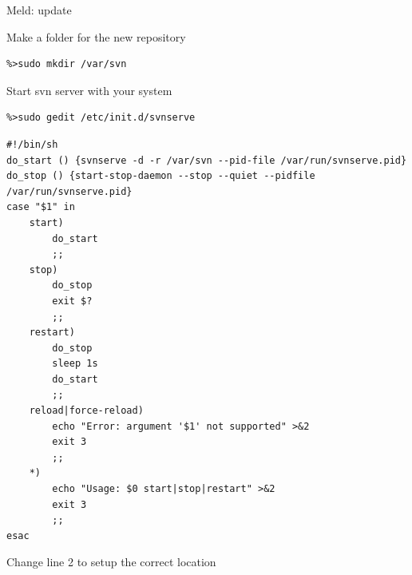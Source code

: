 \documentclass[12pt]{beamer}
\begin{document}
\begin{frame}[fragile]
	\begin{block}{Meld: update}
	\end{block}
\end{frame}





\begin{frame}[fragile]
	\begin{block}{Make a folder for the new repository}
		\begin{verbatim}
%>sudo mkdir /var/svn
		\end{verbatim}
	\end{block}
\end{frame}

\begin{frame}[fragile]
	\begin{block}{Start svn server with your system}
		\begin{verbatim}
%>sudo gedit /etc/init.d/svnserve
		\end{verbatim}
		\end{block}
		\begin{block}{}
		\begin{verbatim}
#!/bin/sh
do_start () {svnserve -d -r /var/svn --pid-file /var/run/svnserve.pid}
do_stop () {start-stop-daemon --stop --quiet --pidfile /var/run/svnserve.pid}
case "$1" in
	start)
  		do_start
 		;;
 	stop)
 		do_stop
 		exit $?
 		;;
 	restart)
 		do_stop
		sleep 1s
 		do_start
 		;;
	reload|force-reload)
		echo "Error: argument '$1' not supported" >&2
		exit 3
		;;
	*)
		echo "Usage: $0 start|stop|restart" >&2
		exit 3
		;;
esac
		\end{verbatim}
		Change line 2 to setup the correct location
	\end{block}
\end{frame}
\end{document}
